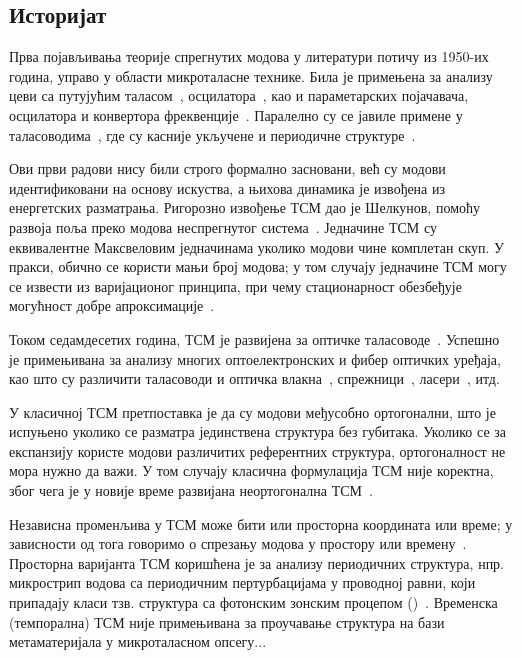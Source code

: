 \subsection{Историјат}
Прва појављивања теорије спрегнутих модова у литератури потичу из 1950-их година, управо у области микроталасне технике. Била је примењена за анализу цеви са путујућим таласом~\cite{pierce1954coupling},  осцилатора~\cite{1471949}, као и параметарских појачавача, осцилатора и конвертора фреквенције~\cite{louisell1960coupled}. Паралелно су се јавиле примене у таласоводима~\cite{1124830,louisell1955analysis}, где су касније укључене и периодичне структуре~\cite{tang1969mode}.

Ови први радови нису били строго формално засновани, већ су модови идентификовани на основу искуства, а њихова динамика је извођена из енергетских разматрања. Ригорозно извођење ТСМ дао је Шелкунов, помоћу развоја поља преко модова неспрегнутог система~\cite{6771476}. Једначине ТСМ су еквивалентне Максвеловим једначинама уколико модови чине комплетан скуп. У пракси, обично се користи мањи број модова; у том случају једначине ТСМ могу се извести из варијационог принципа, при чему стационарност обезбеђује могућност добре апроксимације~\cite{hausproc}.

Током седамдесетих година, ТСМ је развијена за оптичке таласоводе~\cite{6771781,snyder1972coupled,1077767}. Успешно је примењивана за анализу многих оптоелектронских и фибер оптичких уређаја, као што су различити таласоводи и оптичка влакна~\cite{taylor1973optical,mcintyre1973power}, спрежници~\cite{1069190}, ласери~\cite{butler1984coupled}, итд.

У класичној ТСМ претпоставка је да су модови међусобно ортогонални, што је испуњено уколико се разматра јединствена структура без губитака. Уколико се за експанзију користе модови различитих референтних структура, ортогоналност не мора нужно да важи. У том случају класична формулација ТСМ није коректна, због чега је у новије време развијана неортогонална ТСМ~\cite{haus1987coupled,wonjoo}.

Независна променљива у ТСМ може бити или просторна координата или време; у зависности од тога говоримо о спрезању модова у простору или времену~\cite{haus}. Просторна варијанта ТСМ коришћена је за анализу периодичних структура, нпр. микрострип водова са периодичним пертурбацијама у проводној равни, који припадају класи тзв. структура са фотонским зонским процепом ()~\cite{lopetegi_cmt}. Временска (темпорална) ТСМ није примењивана за проучавање структура на бази метаматеријала у микроталасном опсегу...

